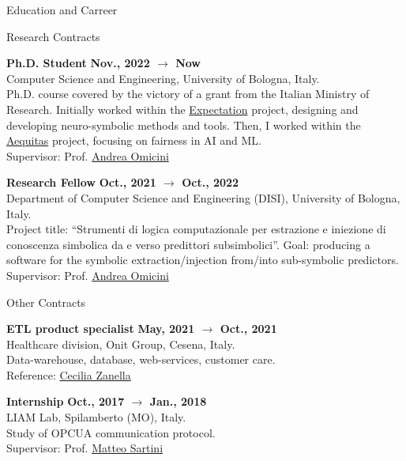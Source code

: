 \documentclass{resume} %
\begin{document}
\begin{rSection}{Education and Carreer}
\begin{rSubsection2}{Research Contracts}
            \item\textbf{ Ph.D. Student }\hfill \textbf{Nov., 2022 $\rightarrow$ Now}
            \\Computer Science and Engineering, University of Bologna, Italy.
            \\Ph.D. course covered by the victory of a grant from the Italian Ministry of Research.
            Initially worked within the \href{https://expectation.ehealth.hevs.ch/posts/home/}{Expectation} project, designing and developing neuro-symbolic methods and tools.
            Then, I worked within the \href{https://www.aequitas-project.eu/}{Aequitas} project, focusing on fairness in AI and ML.
            \\Supervisor: Prof. \href{mailto:andrea.omicini@unibo.it}{Andrea Omicini}
            \item\textbf{ Research Fellow }\hfill \textbf{Oct., 2021 $\rightarrow$ Oct., 2022}
            \\Department of Computer Science and Engineering (DISI), University of Bologna, Italy.
            \\Project title: ``Strumenti di logica computazionale per estrazione e iniezione di conoscenza simbolica da e verso predittori subsimbolici''.
            Goal: producing a software for the symbolic extraction/injection from/into sub-symbolic predictors.
            \\Supervisor: Prof. \href{mailto:andrea.omicini@unibo.it}{Andrea Omicini}

        \end{rSubsection2}


        \begin{rSubsection2}{Other Contracts}

            \item\textbf{ ETL product specialist }\hfill \textbf{May, 2021 $\rightarrow$ Oct., 2021}
            \\Healthcare division, Onit Group, Cesena, Italy.
            \\Data-warehouse, database, web-services, customer care.
            \\Reference: \href{mailto:czanella@onit.it}{Cecilia Zanella}
            \item\textbf{ Internship }\hfill \textbf{Oct., 2017 $\rightarrow$ Jan., 2018}
            \\LIAM Lab, Spilamberto (MO), Italy.
            \\Study of OPCUA communication protocol.
            \\Supervisor: Prof. \href{mailto:matteo.sartini@unibo.it}{Matteo Sartini}

        \end{rSubsection2}


    \end{rSection}
\end{document}
